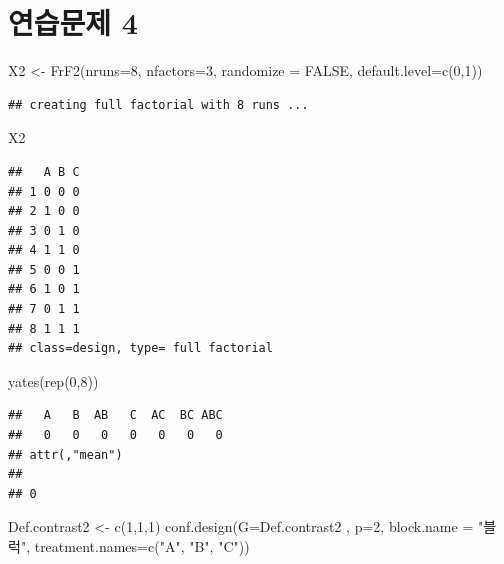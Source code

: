 \documentclass[
]{book}
\newenvironment{Shaded}{\begin{snugshade}}{\end{snugshade}}
\newcommand{\AttributeTok}[1]{\textcolor[rgb]{0.77,0.63,0.00}{#1}}
\newcommand{\ConstantTok}[1]{\textcolor[rgb]{0.00,0.00,0.00}{#1}}
\newcommand{\DecValTok}[1]{\textcolor[rgb]{0.00,0.00,0.81}{#1}}
\newcommand{\FunctionTok}[1]{\textcolor[rgb]{0.00,0.00,0.00}{#1}}
\newcommand{\NormalTok}[1]{#1}
\newcommand{\OtherTok}[1]{\textcolor[rgb]{0.56,0.35,0.01}{#1}}
\newcommand{\StringTok}[1]{\textcolor[rgb]{0.31,0.60,0.02}{#1}}
\begin{document}
\hypertarget{uxc5f0uxc2b5uxbb38uxc81c-4}{%
\section{연습문제 4}\label{uxc5f0uxc2b5uxbb38uxc81c-4}}

\begin{Shaded}
\begin{Highlighting}[]
\NormalTok{X2 }\OtherTok{\textless{}{-}} \FunctionTok{FrF2}\NormalTok{(}\AttributeTok{nruns=}\DecValTok{8}\NormalTok{, }\AttributeTok{nfactors=}\DecValTok{3}\NormalTok{, }\AttributeTok{randomize =} \ConstantTok{FALSE}\NormalTok{,  }\AttributeTok{default.level=}\FunctionTok{c}\NormalTok{(}\DecValTok{0}\NormalTok{,}\DecValTok{1}\NormalTok{))}
\end{Highlighting}
\end{Shaded}

\begin{verbatim}
## creating full factorial with 8 runs ...
\end{verbatim}

\begin{Shaded}
\begin{Highlighting}[]
\NormalTok{X2}
\end{Highlighting}
\end{Shaded}

\begin{verbatim}
##   A B C
## 1 0 0 0
## 2 1 0 0
## 3 0 1 0
## 4 1 1 0
## 5 0 0 1
## 6 1 0 1
## 7 0 1 1
## 8 1 1 1
## class=design, type= full factorial
\end{verbatim}

\begin{Shaded}
\begin{Highlighting}[]
\FunctionTok{yates}\NormalTok{(}\FunctionTok{rep}\NormalTok{(}\DecValTok{0}\NormalTok{,}\DecValTok{8}\NormalTok{))}
\end{Highlighting}
\end{Shaded}

\begin{verbatim}
##   A   B  AB   C  AC  BC ABC 
##   0   0   0   0   0   0   0 
## attr(,"mean")
##   
## 0
\end{verbatim}

\begin{Shaded}
\begin{Highlighting}[]
\NormalTok{Def.contrast2 }\OtherTok{\textless{}{-}} \FunctionTok{c}\NormalTok{(}\DecValTok{1}\NormalTok{,}\DecValTok{1}\NormalTok{,}\DecValTok{1}\NormalTok{)}
\FunctionTok{conf.design}\NormalTok{(}\AttributeTok{G=}\NormalTok{Def.contrast2 , }\AttributeTok{p=}\DecValTok{2}\NormalTok{, }\AttributeTok{block.name =} \StringTok{"블럭"}\NormalTok{, }\AttributeTok{treatment.names=}\FunctionTok{c}\NormalTok{(}\StringTok{"A"}\NormalTok{, }\StringTok{"B"}\NormalTok{, }\StringTok{"C"}\NormalTok{))}
\end{Highlighting}
\end{Shaded}
\end{document}
